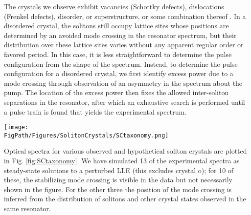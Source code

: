 The crystals we observe exhibit vacancies (Schottky defects), dislocations (Frenkel defects), disorder, or superstructure, or some combination thereof \cite{Ashcroft1976}. In a disordered crystal, the solitons still occupy lattice sites whose positions are determined by an avoided mode crossing in the resonator spectrum, but their distribution over these lattice sites varies without any apparent regular order or favored period. In this case, it is less straightforward to determine the pulse configuration from the shape of the spectrum. Instead, to determine the pulse configuration for a disordered crystal, we first identify excess power due to a mode crossing through observation of an asymmetry in the spectrum about the pump. The location of the excess power then fixes the allowed inter-soliton separations in the resonator, after which an exhaustive search is performed until a pulse train is found that yields the experimental spectrum. 

\begin{sidewaysfigure}[htpb]
	\begin{center}
		\texttt{[image: \\FigPath/Figures/SolitonCrystals/SCtaxonomy.png]}
	\end{center}
	\caption[Taxonomy of soliton crystals]{\textbf{Taxonomy of soliton crystals.} Measured optical spectra are shown in black, with simulations in color. Schematic depictions of the soliton distribution in the resonator co-moving frame are shown to the right of each spectrum. Major ticks in the schematic diagrams indicate the location or expected location of a soliton. Minor ticks indicate lattice sites, corresponding to peaks of the extended background wave due to a mode crossing. (a) A perfect soliton crystal, consisting of 25 uniformly-distributed solitons. (b-e) Soliton crystals exhibiting vacancies. (f-i) Soliton crystals exhibiting Frenkel defects. Shifted solitons still occupy a lattice site. (j) A disordered crystal. (k-n) Crystals exhibiting superstructure. (o) A crystal with irregular inter-soliton spacings. Darker shading indicates a smaller inter-soliton spacing. The range in inter-soliton spacings is 3 $\%$ of the mean. (p-t) A series of crystals generated as the pump laser is moved progressively closer to the stabilizing mode crossing.}
	\label{fig:SCtaxonomy}
\end{sidewaysfigure}


Optical spectra for various observed and hypothetical soliton crystals are plotted in Fig. \ref{fig:SCtaxonomy}. We have simulated 13 of the experimental spectra as steady-state solutions to a perturbed LLE (this excludes crystal o); for 10 of these, the stabilizing mode crossing is visible in the data but not necessarily shown in the figure. For the other three the position of the mode crossing is inferred from the distribution of solitons and other crystal states observed in the same resonator.


